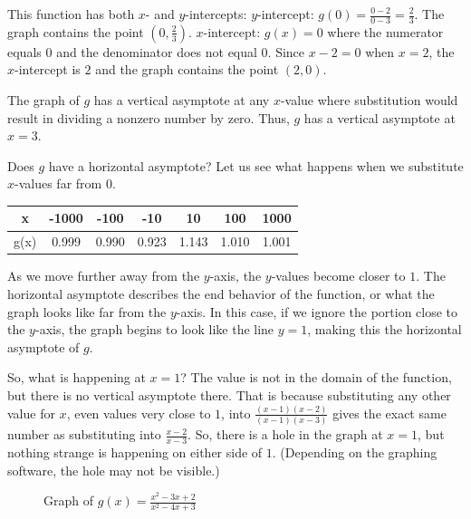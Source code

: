 This function has both \( x \)- and \( y \)-intercepts:
\( y \)-intercept: \( g(0) = \frac{0-2}{0-3} = \frac{2}{3} \). The graph contains the point \( (0, \frac{2}{3}) \).
\( x \)-intercept: \( g(x) = 0 \) where the numerator equals \( 0 \) and the denominator does not equal \( 0 \). Since \( x - 2 = 0 \) when \( x = 2 \), the \( x \)-intercept is \( 2 \) and the graph contains the point \( (2, 0) \).

The graph of \( g \) has a vertical asymptote at any \( x \)-value where substitution would result in dividing a nonzero number by zero. Thus, \( g \) has a vertical asymptote at \( x = 3 \).

Does \( g \) have a horizontal asymptote? Let us see what happens when we substitute \( x \)-values far from \( 0 \).

\begin{center}
\begin{tabular}{ |c|c|c|c|c|c|c| } 
 \hline
 x & -1000 & -100 & -10 & 10 & 100 & 1000 \\ 
 \hline
 g(x) & 0.999 & 0.990 & 0.923 & 1.143 & 1.010 & 1.001 \\ 
 \hline
\end{tabular}
\end{center}

As we move further away from the \( y \)-axis, the \( y \)-values become closer to \( 1 \). The horizontal asymptote describes the end behavior of the function, or what the graph looks like far from the \( y \)-axis. In this case, if we ignore the portion close to the \( y \)-axis, the graph begins to look like the line \( y = 1 \), making this the horizontal asymptote of \( g \). 

So, what is happening at \( x = 1 \)? The value is not in the domain of the function, but there is no vertical asymptote there. That is because substituting any other value for \( x \), even values very close to \( 1 \), into \( \frac{(x - 1)(x - 2)}{(x - 1)(x - 3)} \) gives the exact same number as substituting into \( \frac{x-2}{x-3} \). So, there is a hole in the graph at \( x = 1 \), but nothing strange is happening on either side of \( 1 \). (Depending on the graphing software, the hole may not be visible.)

\begin{figure}[H]
  \centering
  \caption{Graph of \( g(x) = \frac{x^2 - 3x + 2}{x^2 - 4x + 3} \)}
\end{figure}

